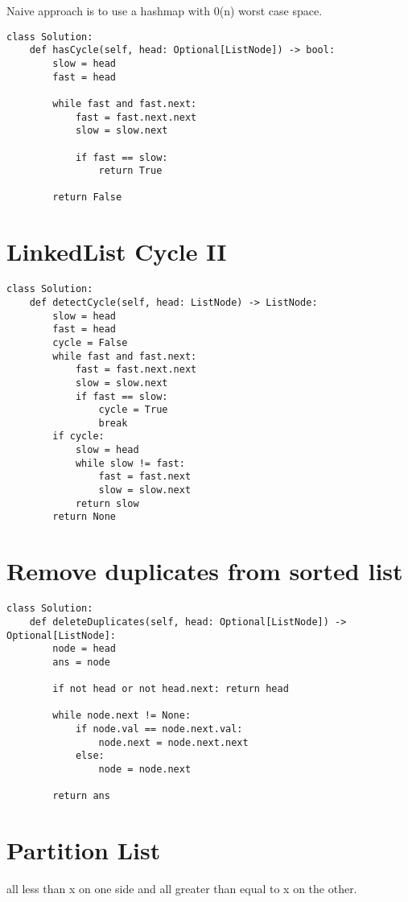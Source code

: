 \documentclass[24pt, a4]{article}
\begin{document}
Naive approach is to use a hashmap with 0(n) worst case space.
\begin{lstlisting}
class Solution:
    def hasCycle(self, head: Optional[ListNode]) -> bool:
        slow = head
        fast = head
        
        while fast and fast.next:
            fast = fast.next.next
            slow = slow.next
            
            if fast == slow:
                return True
        
        return False
\end{lstlisting}

\section{LinkedList Cycle II}

\begin{lstlisting}
class Solution:
    def detectCycle(self, head: ListNode) -> ListNode:
        slow = head
        fast = head
        cycle = False
        while fast and fast.next:
            fast = fast.next.next
            slow = slow.next
            if fast == slow:
                cycle = True
                break
        if cycle:
            slow = head
            while slow != fast:
                fast = fast.next
                slow = slow.next
            return slow
        return None
\end{lstlisting}


\section{Remove duplicates from sorted list}

\begin{lstlisting}
class Solution:
    def deleteDuplicates(self, head: Optional[ListNode]) -> Optional[ListNode]:        
        node = head
        ans = node
        
        if not head or not head.next: return head
        
        while node.next != None:
            if node.val == node.next.val:
                node.next = node.next.next
            else:
                node = node.next
                    
        return ans
\end{lstlisting}

\section{Partition List}
all less than x on one side and all greater than equal to x on the other.
\end{document}
